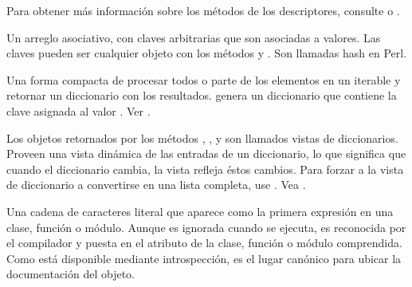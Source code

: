 \documentclass[a4,10pt,spanish]{sphinxmanual}
\begin{document}
\begin{description}
\sphinxAtStartPar
Para obtener más información sobre los métodos de los descriptores, consulte  o .

\item[{diccionario\index{diccionario@\spxentry{diccionario}|spxpagem}\phantomsection\label{\detokenize{glossary:term-dictionary}}}] \leavevmode
\sphinxAtStartPar
Un arreglo asociativo, con claves arbitrarias que son asociadas a valores. Las claves pueden ser cualquier objeto con los métodos  y  . Son llamadas hash en Perl.

\item[{comprensión de diccionarios\index{comprensión de diccionarios@\spxentry{comprensión de diccionarios}|spxpagem}\phantomsection\label{\detokenize{glossary:term-dictionary-comprehension}}}] \leavevmode
\sphinxAtStartPar
Una forma compacta de procesar todos o parte de los elementos en un iterable y retornar un diccionario con los resultados.  genera un diccionario que contiene la clave  asignada al valor . Ver .

\item[{vista de diccionario\index{vista de diccionario@\spxentry{vista de diccionario}|spxpagem}\phantomsection\label{\detokenize{glossary:term-dictionary-view}}}] \leavevmode
\sphinxAtStartPar
Los objetos retornados por los métodos  , , y  son llamados vistas de diccionarios. Proveen una vista dinámica de las entradas de un diccionario, lo que significa que cuando el diccionario cambia, la vista refleja éstos cambios. Para forzar a la vista de diccionario a convertirse en una lista completa, use .  Vea .

\item[{docstring\index{docstring@\spxentry{docstring}|spxpagem}\phantomsection\label{\detokenize{glossary:term-docstring}}}] \leavevmode
\sphinxAtStartPar
Una cadena de caracteres literal que aparece como la primera expresión en una clase, función o módulo. Aunque es ignorada cuando se ejecuta, es reconocida por el compilador y puesta en el atributo  de la clase, función o módulo comprendida.  Como está disponible mediante introspección, es el lugar canónico para ubicar la documentación del objeto.


\end{description}
\end{document}
